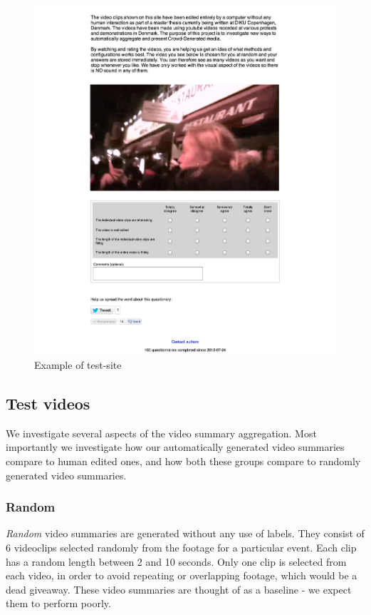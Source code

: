 \begin{figure}
     \centering
     \includegraphics[width=1.0\textwidth]{img/website.png}
     \caption{Example of test-site}\label{fig:website}
\end{figure}
%
\subsection{Test videos}
%
We investigate several aspects of the video summary aggregation. Most importantly we investigate how our automatically generated video summaries compare to human edited ones, and how both these groups compare to randomly generated video summaries.
\subsubsection{Random}
%
\textit{Random} video summaries are generated without any use of labels. They consist of 6 videoclips selected randomly from the footage for a particular event. Each clip has a random length between 2 and 10 seconds. Only one clip is selected from each video, in order to avoid repeating or overlapping footage, which would be a dead giveaway. These video summaries are thought of as a baseline - we expect them to perform poorly.
%
